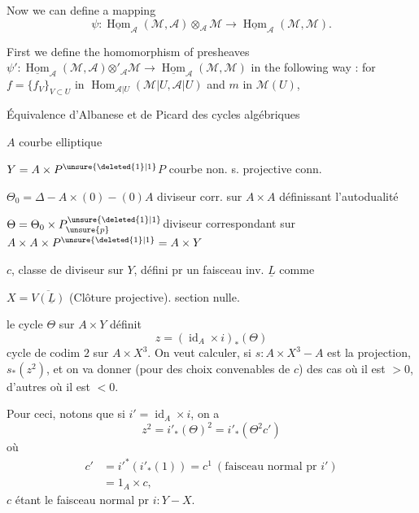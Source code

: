 Now we can define a mapping
\[
\psi:\underline{\operatorname{Hom}}_{\mathcal A}(\mathcal M,\mathcal A)\otimes_{\mathcal A}\mathcal M\longrightarrow\underline{\operatorname{Hom}}_{\mathcal A}(\mathcal M,\mathcal M).
\]

First we define the homomorphism of presheaves
$\psi':\underline{\operatorname{Hom}}_{\mathcal A}(\mathcal M,\mathcal A)\mathbin{\otimes'_{\mathcal A}}\mathcal M\longrightarrow\underline{\operatorname{Hom}}_{\mathcal A}(\mathcal M,\mathcal M)$ in the following way : for
$f=\{f_V\}_{V\subset U}$ in $\operatorname{Hom}_{\mathcal A|U}(\mathcal M|U,\mathcal A|U)$ and $m$ in $\mathcal M(U)$,


Équivalence d'Albanese et de Picard des cycles algébriques




$A$ courbe elliptique

$Y=A\times P^{\unsure{\deleted{1}|1}}$\qquad $P$ courbe non. s. projective conn.

$\Theta_0=\Delta-A\times(0)-(0)A$  diviseur corr. sur $A\times A$ définissant l'autodualité

$\Theta=\Theta_0\times P_{\unsure{p}}^{\unsure{\deleted{1}|1}}$\qquad diviseur correspondant sur $A\times A\times P^{\unsure{\deleted{1}|1}}=A\times Y$

$c$, classe de diviseur sur $Y$, défini pr un  faisceau inv. $\underline L$ comme 

$X=\overline{V(\underline L)}$ (Clôture projective).
section nulle.

le cycle $\Theta$ sur $A\times Y$ définit
\[
z=(\operatorname{id}_A\times i)_*(\Theta)
\]
cycle de codim $2$ sur  $A\times X^3$. On veut calculer, si $s:A\times X^3\mathbin{-}A$ est la projection, $s_*(z^2)$, et on va donner (pour des choix convenables de $c$) des cas où il est $>0$, d'autres où il est $<0$.

Pour ceci, notons que si $i'=\operatorname{id}_A\times i$, on a
\[
z^2=i'_*(\Theta)^2=i'_*(\Theta^2c')
\]
où
\[
\begin{aligned}
c'&=i'^*(i'_*(1))=c^1\ (\text{faisceau normal pr }i')\\
&=1_A\times c,
\end{aligned}
\]
$c$ étant le faisceau normal pr  $i:Y\mathbin{-}X$.

